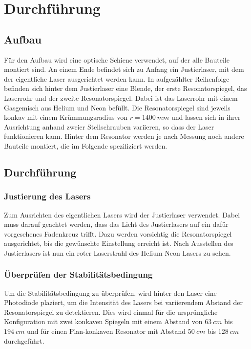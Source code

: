 \section{Durchführung}
\label{sec:Durchführung}

\subsection{Aufbau}

Für den Aufbau wird eine optische Schiene verwendet, auf der alle Bauteile montiert sind. An einem Ende befindet sich zu Anfang ein Justierlaser, mit dem der eigentliche Laser 
ausgerichtet werden kann. In aufgezählter Reihenfolge befinden sich hinter dem Justierlaser eine Blende, der erste Resonatorspiegel, das Laserrohr und der zweite Resonatorspiegel. 
Dabei ist das Laserrohr mit einem Gasgemisch aus Helium und Neon befüllt. Die Resonatorspiegel sind jeweils konkav mit einem Krümmungsradius von $r = \SI{1400}{mm} $ und lassen 
sich in ihrer Ausrichtung anhand zweier Stellschrauben variieren, so dass der Laser funktionieren kann. Hinter dem Resonator werden je nach Messung noch andere Bauteile montiert, 
die im Folgende spezifiziert werden. 

\subsection{Durchführung}

\subsubsection{Justierung des Lasers}
Zum Ausrichten des eigentlichen Lasers wird der Justierlaser verwendet. Dabei muss darauf geachtet werden, dass das Licht des Justierlasers auf ein dafür vorgesehenes Fadenkreuz
trifft. Dazu werden vorsichtig die Resonatorspiegel ausgerichtet, bis die gewünschte Einstellung erreicht ist. Nach Ausstellen des Justierlasers ist nun ein roter Laserstrahl des 
Helium Neon Lasers zu sehen. 

\subsubsection{Überprüfen der Stabilitätsbedingung}
Um die Stabilitätsbedingung zu überprüfen, wird hinter den Laser eine Photodiode plaziert, um die Intensität des Lasers bei variierendem Abstand der Resonatorspiegel zu detektieren.
Dies wird einmal für die ursprüngliche Konfiguration mit zwei konkaven Spiegeln mit einem Abstand von $\SI{63}{cm} $ bis $\SI{194}{cm} $ und für einen Plan-konkaven Resonator mit 
Abstand $\SI{50}{cm} $ bis $\SI{128}{cm} $ durchgeführt. 

